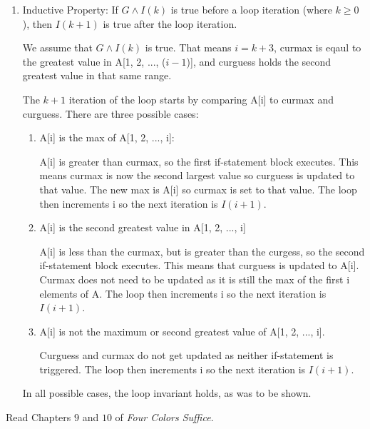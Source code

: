 \documentclass{article}
\begin{document}
\begin{enumerate}
\begin{enumerate}
	\item Inductive Property: If $G \land I(k)$ is true before a loop iteration (where $k \geq 0$), then $I(k+1)$ is true after the loop iteration.
	
	We assume that $G \land I(k)$ is true. That means $i = k+3$, curmax is eqaul to the greatest value in A[1, 2, ..., ($i-1$)], and curguess holds the second greatest value in that same range.
	
	The $k+1$ iteration of the loop starts by comparing A[i] to curmax and curguess. There are three possible cases:
	
	\begin{enumerate}
	\item A[i] is the max of A[1, 2, ..., i]:
	
	A[i] is greater than curmax, so the first if-statement block executes. This means curmax is now the second largest value so curguess is updated to that value. 
	The new max is A[i] so curmax is set to that value. The loop then increments i so the next iteration is $I(i+1)$.
	
	\item A[i] is the second greatest value in A[1, 2, ..., i]
	
	A[i] is less than the curmax, but is greater than the curgess, so the second if-statement block executes. This means that curguess is updated to A[i]. 
	Curmax does not need to be updated as it is still the max of the first i elements of A. The loop then increments i so the next iteration is $I(i+1)$.
	
	\item A[i] is not the maximum or second greatest value of A[1, 2, ..., i].
	
	Curguess and curmax do not get updated as neither if-statement is triggered.  The loop then increments i so the next iteration is $I(i+1)$.
\end{enumerate}

	In all possible cases, the loop invariant holds, as was to be shown.
\end{enumerate}



 

Read Chapters $9$ and $10$ of \emph{Four Colors Suffice}.

\begin{enumerate}


\end{enumerate}
\end{enumerate}
\end{document}
